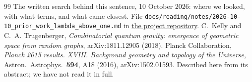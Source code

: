 \documentclass[11pt,letterpaper]{article}
\begin{document}
\begin{thebibliography}{99}
 The written search behind this sentence, 10 October 2026: where we looked, with what
terms, and what came closest. File
\texttt{docs/reading/notes/2026-10-10\_prior\_work\_lambda\_above\_one.md} in
\href{https://github.com/EmilySmithCreate/RecreationalPhysics}{the project repository}.
 C.~Kelly and C.~A. Trugenberger, \emph{Combinatorial quantum gravity: emergence of
geometric space from random graphs}, arXiv:1811.12905 (2018).
 Planck Collaboration, \emph{Planck 2015 results. XVIII. Background geometry and
topology of the Universe}, Astron.\ Astrophys.\ \textbf{594}, A18 (2016), arXiv:1502.01593. Described
here from its abstract; we have not read it in full.
\end{thebibliography}

\end{document}
